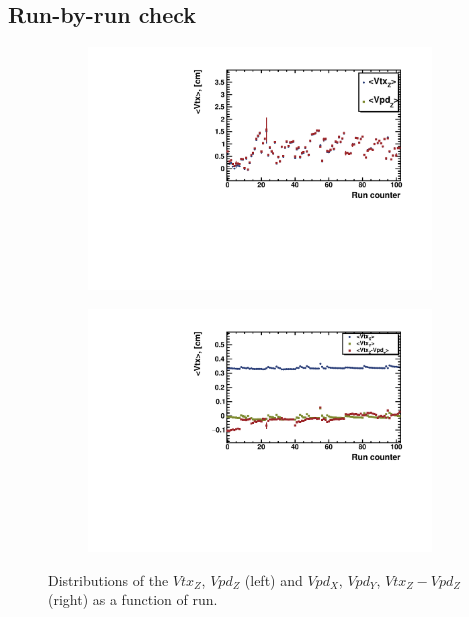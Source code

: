 \FloatBarrier
\subsection{Run-by-run check}

\begin{figure}[ht]
    \begin{subfigure}{.49\textwidth}
        \centering
        \includegraphics[width=1.\linewidth]{Figures/VtxZVsRun.pdf}
    \end{subfigure}
    \begin{subfigure}{.49\textwidth}
        \centering
        \includegraphics[width=1.\linewidth]{Figures/VtxXYVsRun.pdf}
    \end{subfigure}
    \label{fig:VtxVsRun}
    \caption{Distributions of the $Vtx_Z$, $Vpd_Z$ (left) and $Vpd_X$, $Vpd_Y$, $Vtx_Z - Vpd_Z$ (right) as a function of run.}
\end{figure}

